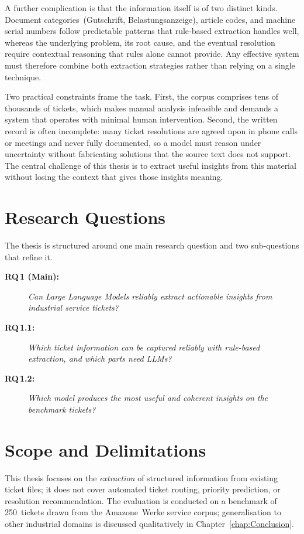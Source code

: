 A further complication is that the information itself is of two distinct kinds.
Document categories~(Gutschrift, Belastungsanzeige), article codes, and machine
serial numbers follow predictable patterns that rule-based extraction handles
well, whereas the underlying problem, its root cause, and the eventual
resolution require contextual reasoning that rules alone cannot provide.  Any
effective system must therefore combine both extraction strategies rather than
relying on a single technique.

Two practical constraints frame the task.  First, the corpus comprises tens of
thousands of tickets, which makes manual analysis infeasible and demands a
system that operates with minimal human intervention.  Second, the written
record is often incomplete: many ticket resolutions are agreed upon in phone
calls or meetings and never fully documented, so a model must reason under
uncertainty without fabricating solutions that the source text does not
support.  The central challenge of this thesis is to extract useful insights
from this material without losing the context that gives those insights
meaning.

\section{Research Questions}
\label{sec:rq}
%
The thesis is structured around one main research question and two
sub-questions that refine it.

\begin{description}
    \item[\textbf{RQ\,1 (Main):}] \emph{Can Large Language Models reliably extract
          actionable insights from industrial service tickets?}

    \item[\textbf{RQ\,1.1:}] \emph{Which ticket information can be captured reliably
          with rule-based extraction, and which parts need LLMs?}

    \item[\textbf{RQ\,1.2:}] \emph{Which model produces the most useful and coherent
          insights on the benchmark tickets?}
\end{description}

\section{Scope and Delimitations}
\label{sec:scope}
%
This thesis focuses on the \emph{extraction} of structured information from existing
ticket files; it does not cover automated ticket routing, priority prediction, or
resolution recommendation.  The evaluation is conducted on a benchmark of
250~tickets drawn from the Amazone~Werke service corpus; generalisation to other
industrial domains is discussed qualitatively in Chapter~\ref{chap:Conclusion}.

